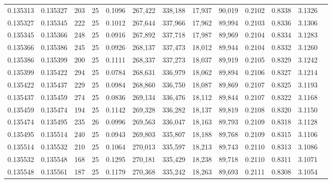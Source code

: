 \begin{tabular}{rrrrrrrrrrrrr}
0.135313 & 0.135327 &   203 &  25 &                                     0.1096 & 267,422 & 338,188 &  17,937 &  90,019 & 0.2102 & 0.8338 & 3.1326 \\
0.135327 & 0.135345 &   222 &  25 &                                     0.1012 & 267,644 & 337,966 &  17,962 &  89,994 & 0.2103 & 0.8336 & 3.1306 \\
0.135345 & 0.135366 &   248 &  25 &                                     0.0916 & 267,892 & 337,718 &  17,987 &  89,969 & 0.2104 & 0.8334 & 3.1283 \\
0.135366 & 0.135386 &   245 &  25 &                                     0.0926 & 268,137 & 337,473 &  18,012 &  89,944 & 0.2104 & 0.8332 & 3.1260 \\
0.135386 & 0.135399 &   200 &  25 &                                     0.1111 & 268,337 & 337,273 &  18,037 &  89,919 & 0.2105 & 0.8329 & 3.1242 \\
0.135399 & 0.135422 &   294 &  25 &                                     0.0784 & 268,631 & 336,979 &  18,062 &  89,894 & 0.2106 & 0.8327 & 3.1214 \\
0.135422 & 0.135437 &   229 &  25 &                                     0.0984 & 268,860 & 336,750 &  18,087 &  89,869 & 0.2107 & 0.8325 & 3.1193 \\
0.135437 & 0.135459 &   274 &  25 &                                     0.0836 & 269,134 & 336,476 &  18,112 &  89,844 & 0.2107 & 0.8322 & 3.1168 \\
0.135459 & 0.135474 &   194 &  25 &                                     0.1142 & 269,328 & 336,282 &  18,137 &  89,819 & 0.2108 & 0.8320 & 3.1150 \\
0.135474 & 0.135495 &   235 &  26 &                                     0.0996 & 269,563 & 336,047 &  18,163 &  89,793 & 0.2109 & 0.8318 & 3.1128 \\
0.135495 & 0.135514 &   240 &  25 &                                     0.0943 & 269,803 & 335,807 &  18,188 &  89,768 & 0.2109 & 0.8315 & 3.1106 \\
0.135514 & 0.135532 &   210 &  25 &                                     0.1064 & 270,013 & 335,597 &  18,213 &  89,743 & 0.2110 & 0.8313 & 3.1086 \\
0.135532 & 0.135548 &   168 &  25 &                                     0.1295 & 270,181 & 335,429 &  18,238 &  89,718 & 0.2110 & 0.8311 & 3.1071 \\
0.135548 & 0.135561 &   187 &  25 &                                     0.1179 & 270,368 & 335,242 &  18,263 &  89,693 & 0.2111 & 0.8308 & 3.1054 \\

\end{tabular}
